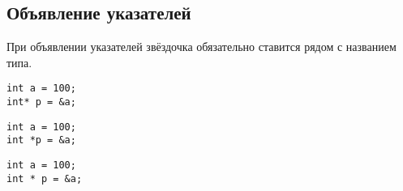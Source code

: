 \documentclass{article}
\begin{document}
\subsection*{Объявление указателей}
При объявлении указателей звёздочка обязательно ставится рядом с названием типа.
\begin{multicols}{3}
\noindent
\begin{lstlisting}[backgroundcolor = \color{correctcolor}]
int a = 100;
int* p = &a;
\end{lstlisting}
\begin{lstlisting}[backgroundcolor = \color{wrongcolor}]
int a = 100;
int *p = &a;
\end{lstlisting}
\begin{lstlisting}[backgroundcolor = \color{wrongcolor}]
int a = 100;
int * p = &a;
\end{lstlisting}
\end{multicols}
\end{document}
